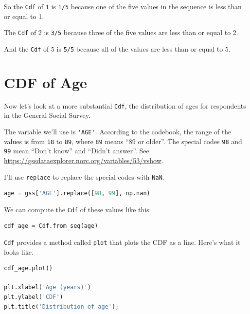 So the \passthrough{\lstinline!Cdf!} of \passthrough{\lstinline!1!} is
\passthrough{\lstinline!1/5!} because one of the five values in the
sequence is less than or equal to 1.

The \passthrough{\lstinline!Cdf!} of 2 is \passthrough{\lstinline!3/5!}
because three of the five values are less than or equal to 2.

And the \passthrough{\lstinline!Cdf!} of 5 is
\passthrough{\lstinline!5/5!} because all of the values are less than or
equal to 5.

\hypertarget{cdf-of-age}{%
\section{CDF of Age}\label{cdf-of-age}}

Now let's look at a more substantial \passthrough{\lstinline!Cdf!}, the
distribution of ages for respondents in the General Social Survey.

The variable we'll use is \passthrough{\lstinline!'AGE'!}. According to
the codebook, the range of the values is from
\passthrough{\lstinline!18!} to \passthrough{\lstinline!89!}, where
\passthrough{\lstinline!89!} means ``89 or older''. The special codes
\passthrough{\lstinline!98!} and \passthrough{\lstinline!99!} mean
``Don't know'' and ``Didn't answer''. See
\url{https://gssdataexplorer.norc.org/variables/53/vshow}.

I'll use \passthrough{\lstinline!replace!} to replace the special codes
with \passthrough{\lstinline!NaN!}.

\begin{lstlisting}[language=Python,style=source]
age = gss['AGE'].replace([98, 99], np.nan)
\end{lstlisting}

We can compute the \passthrough{\lstinline!Cdf!} of these values like
this:

\begin{lstlisting}[language=Python,style=source]
cdf_age = Cdf.from_seq(age)
\end{lstlisting}

\passthrough{\lstinline!Cdf!} provides a method called
\passthrough{\lstinline!plot!} that plots the CDF as a line. Here's what
it looks like.

\begin{lstlisting}[language=Python,style=source]
cdf_age.plot()

plt.xlabel('Age (years)')
plt.ylabel('CDF')
plt.title('Distribution of age');
\end{lstlisting}

